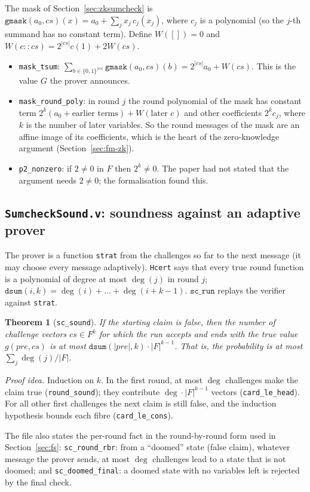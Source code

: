 \documentclass[11pt,a4paper]{article}
\theoremstyle{definition}
\theoremstyle{plain}
\newtheorem{theorem}[definition]{Theorem}
\begin{document}
The mask of Section~\ref{sec:zksumcheck} is
$\mathtt{gmask}(a_0,cs)(x)=a_0+\sum_jx_j\,c_j(x_j)$, where $c_j$ is a polynomial (so the $j$-th
summand has no constant term). Define $W([])=0$ and $W(c::cs)=2^{|cs|}c(1)+2W(cs)$.
\begin{itemize}[leftmargin=1.3em]
\item \texttt{mask\_tsum}: $\sum_{b\in\{0,1\}^{|cs|}}\mathtt{gmask}(a_0,cs)(b)=2^{|cs|}a_0+W(cs)$. This
  is the value $G$ the prover announces.
\item \texttt{mask\_round\_poly}: in round $j$ the round polynomial of the mask has constant term
  $2^{k}(a_0+\text{earlier terms})+W(\text{later }c)$ and other coefficients $2^{k}c_j$, where $k$ is
  the number of later variables. So the round messages of the mask are an affine image of its
  coefficients, which is the heart of the zero-knowledge argument (Section~\ref{sec:fm-zk}).
\item \texttt{p2\_nonzero}: if $2\ne0$ in $F$ then $2^k\ne0$. The paper had not stated that the
  argument needs $2\ne0$; the formalisation found this.
\end{itemize}

\subsection{\texttt{SumcheckSound.v}: soundness against an adaptive prover}

The prover is a function \texttt{strat} from the challenges so far to the next message (it may
choose every message adaptively). \texttt{Hcert} says that every true round function is a
polynomial of degree at most $\deg(j)$ in round $j$; $\mathtt{dsum}(i,k)=\deg(i)+\dots+\deg(i+k-1)$.
$\mathtt{sc\_run}$ replays the verifier against \texttt{strat}.
\begin{theorem}[\texttt{sc\_sound}]
If the starting claim is false, then the number of challenge vectors $cs\in F^k$ for which the run
accepts and ends with the true value $g(pre,cs)$ is at most $\mathtt{dsum}(|pre|,k)\cdot|F|^{k-1}$.
That is, the probability is at most $\sum_j\deg(j)/|F|$.
\end{theorem}
\emph{Proof idea.} Induction on $k$. In the first round, at most $\deg$ challenges make the claim
true (\texttt{round\_sound}); they contribute $\deg\cdot|F|^{k-1}$ vectors (\texttt{card\_le\_head}).
For all other first challenges the next claim is still false, and the induction hypothesis bounds
each fibre (\texttt{card\_le\_cons}).

The file also states the per-round fact in the round-by-round form used in Section~\ref{sec:fs}:
\texttt{sc\_round\_rbr}: from a ``doomed'' state (false claim), whatever message the prover sends, at
most $\deg$ challenges lead to a state that is not doomed; and \texttt{sc\_doomed\_final}: a doomed
state with no variables left is rejected by the final check.
\end{document}
